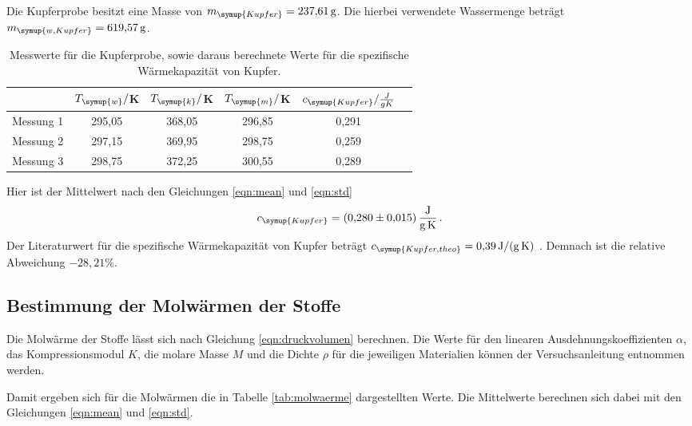 Die Kupferprobe besitzt eine Masse von $m_{\symup{Kupfer}}=\SI{237.61}{\gram}$.
Die hierbei verwendete Wassermenge beträgt $m_{\symup{w,Kupfer}}=\SI{619.57}{\gram}$.

\begin{table}
  \centering
  \caption{Messwerte für die Kupferprobe, sowie daraus berechnete Werte für die spezifische
  Wärmekapazität von Kupfer.}
  \label{tab:kupfer}
  \begin{tabular}{c c c c c c}
    \toprule
    & $T_{\symup{w}}/$K & $T_{\symup{k}}/$K & $T_{\symup{m}}/$K & $c_{\symup{Kupfer}}/\frac{J}{g K}$ \\
    \midrule
    Messung 1 & 295,05 & 368,05 & 296,85 & 0,291 \\
    Messung 2 & 297,15 & 369,95 & 298,75 & 0,259 \\
    Messung 3 & 298,75 & 372,25 & 300,55 & 0,289 \\
    \bottomrule
  \end{tabular}
\end{table}

Hier ist der Mittelwert nach den Gleichungen \eqref{eqn:mean} und
\eqref{eqn:std}
\begin{equation}
  c_{\symup{Kupfer}} = \SI{0.280(0015)}{\joule\per\gram\per\kelvin} \,.\nonumber
\end{equation}
Der Literaturwert für die spezifische Wärmekapazität von Kupfer beträgt
$c_{\symup{Kupfer,theo}}=\SI{0.39}{\joule\per\gram\per\kelvin}$ \cite{werte}.
Demnach ist die relative Abweichung $-28,21\%$.


\subsection{Bestimmung der Molwärmen der Stoffe}
\label{sec:molwaerme}

Die Molwärme der Stoffe lässt sich nach Gleichung \eqref{eqn:druckvolumen}
berechnen. Die Werte für den linearen Ausdehnungskoeffizienten $\alpha$,
das Kompressionsmodul $K$, die molare Masse $M$ und die Dichte $\rho$
für die jeweiligen Materialien können der Versuchsanleitung \cite{Versuchsanleitung}
entnommen werden.

Damit ergeben sich für die Molwärmen die in Tabelle \ref{tab:molwaerme} dargestellten Werte.
Die Mittelwerte berechnen sich dabei mit den Gleichungen \eqref{eqn:mean} und
\eqref{eqn:std}.

